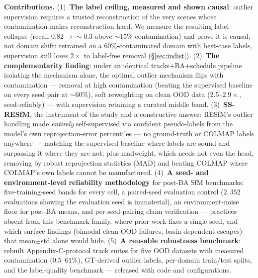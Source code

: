 \documentclass{article}
\newcommand{\mad}{madweight}
\begin{document}
\noindent\textbf{Contributions.}
(1)~\textbf{The label ceiling, measured and shown causal}: outlier supervision requires a
trusted reconstruction of the very scenes whose contamination makes reconstruction hard.
We measure the resulting label collapse (recall $0.82\!\to\!\sim\!0.3$ above
${\sim}15\%$ contamination) and prove it is causal, not domain shift: retrained
\emph{on} a $60\%$-contaminated domain with best-case labels, supervision still loses
$2\times$ to label-free removal (\S\ref{sec:indist}).
(2)~\textbf{The complementarity finding}: under an identical tracks+BA+schedule pipeline
isolating the mechanism alone, the optimal outlier mechanism flips with contamination ---
removal at high contamination (beating the supervised baseline on every seed pair at
$\sim\!60\%$), soft reweighting on clean OOD data ($2.5$--$2.9\times$, seed-reliably) ---
with supervision retaining a curated middle band.
(3)~\textbf{SS-RESfM}, the instrument of the study and a constructive answer: RESfM's
outlier handling made \emph{entirely} self-supervised via confident pseudo-labels from
the model's own reprojection-error percentiles --- no ground-truth or COLMAP labels
anywhere --- matching the supervised baseline where labels are sound and surpassing it
where they are not; plus \mad{}, which needs not even the head, removing by robust
reprojection statistics (MAD) and beating COLMAP where COLMAP's own labels cannot be
manufactured.
(4)~\textbf{A seed- and environment-level reliability methodology} for post-BA SfM
benchmarks: five-training-seed bands for every cell, a paired-seed evaluation control
($2{,}352$ evaluations showing the evaluation seed is immaterial), an
environment-noise floor for post-BA means, and per-seed-pairing claim verification ---
practices absent from this benchmark family, where prior work fixes a single seed, and
which surface findings (bimodal clean-OOD failures, basin-dependent escapes) that
mean$\pm$std alone would hide.
(5)~\textbf{A reusable robustness benchmark}: rebuilt Appendix-C-protocol track suites
for five OOD datasets with measured contamination ($0.5$--$61\%$), GT-derived outlier
labels, per-domain train/test splits, and the label-quality benchmark --- released with
code and configurations.
\end{document}
